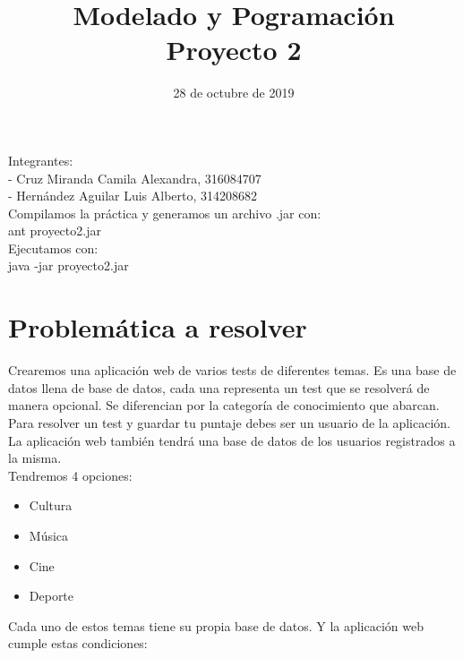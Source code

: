 \documentclass{article}
\title{Modelado y Pogramación\\ Proyecto 2}
\date{28 de octubre de 2019}
\begin{document}
\maketitle

Integrantes:\\
- Cruz Miranda Camila Alexandra, 316084707\\
- Hernández Aguilar Luis Alberto, 314208682\\

Compilamos la práctica y generamos un archivo .jar con:\\
 ant proyecto2.jar\\

Ejecutamos con:\\
java -jar proyecto2.jar

\section{Problemática a resolver}
Crearemos una aplicación web de varios tests de diferentes temas. Es una base de datos llena de base de datos, cada una representa un test que se resolverá de manera opcional. Se diferencian por la categoría de conocimiento que abarcan. Para resolver un test y guardar tu puntaje debes ser un usuario de la aplicación. La aplicación web también tendrá una base de datos de los usuarios registrados a la misma. \\

Tendremos 4 opciones:

\begin{itemize}
    \item Cultura
    \item Música
    \item Cine
    \item Deporte
\end{itemize}
Cada uno de estos temas tiene su propia base de datos. Y la aplicación web cumple estas condiciones:
\end{document}
